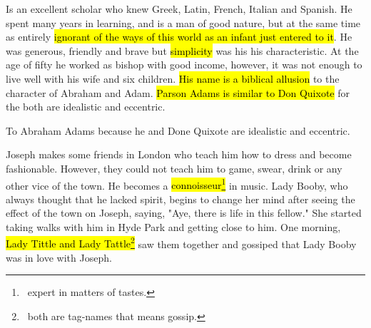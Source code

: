\documentclass[12pt, a4paper]{article}
\begin{document}

Is an excellent scholar who knew Greek, Latin, French, Italian and Spanish.
He spent many years in learning, and is a man of good nature, but at the 
same time as entirely \hl{ignorant of the ways of this world as an infant just
entered to it}. He was generous, friendly and brave but \hl{simplicity} was his 
his characteristic. At the age of fifty he worked as bishop with good income,
however, it was not enough to live well with his wife and six children. \hl{His name
is a biblical allusion} to the character of Abraham and Adam. \hl{Parson Adams is similar to 
Don Quixote} for the both are idealistic and eccentric.




To Abraham Adams because he and Done Quixote are idealistic and eccentric.


\ind Joseph makes some friends in London who teach him how to dress and become 
fashionable. However, they could not teach him to game, swear, drink or
any other vice of the town. He becomes a \hl{connoisseur\footnote{\, 
expert in matters of tastes.}} in music. Lady Booby, who always thought that 
he lacked spirit, begins to change her mind after seeing the effect of the town
on Joseph, saying, "Aye, there is life in this fellow." She started taking walks
with him in Hyde Park and getting close to him. One morning, \hl{Lady Tittle and Lady
Tattle\footnote{\, both are tag-names that means gossip.}} saw them together and
gossiped that Lady Booby was in love with Joseph.



  
\end{document}
